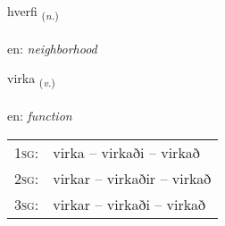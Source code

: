 \documentclass[frontgrid, backgrid]{flacards}\usepackage[]{graphicx}\usepackage[]{color}
\begin{document}
\renewcommand{\flhead}{\vskip5pt \fboxsep=0pt {\small\bfseries\footnotesize Nafnorð | Noun}}
\renewcommand{\fcfoot}{\vskip5pt \fboxsep=0pt \hspace{2pt}{\small\bfseries\footnotesize 2K}}

\renewcommand{\blhead}{\vskip5pt {\small\bfseries\footnotesize Nafnorð | Noun }}
\renewcommand{\bcfoot}{\vskip5pt \hspace{2pt}{\small\bfseries\footnotesize 2K}}


{hverfi \small{\textsubscript{(\textit{n.})}} \\[1ex] %
\textphonetic{[kʰvɛrvɪ]} \\
en: \emph{neighborhood} \\  [2ex]
\renewcommand*{\arraystretch}{0.8}
}

\renewcommand{\flhead}{\vskip5pt \fboxsep=0pt {\small\bfseries\footnotesize Sagnorð | Verb}}
\renewcommand{\fcfoot}{\vskip5pt \fboxsep=0pt \hspace{2pt}{\small\bfseries\footnotesize 2K}}

\renewcommand{\blhead}{\vskip5pt {\small\bfseries\footnotesize Sagnorð | Verb }}
\renewcommand{\bcfoot}{\vskip5pt \hspace{2pt}{\small\bfseries\footnotesize 2K}}


{virka \small{\textsubscript{(\textit{v.})}} \\[1ex] %
\textphonetic{[vɪr̥ka]} \\
en: \emph{function} \\  [2ex]
\renewcommand*{\arraystretch}{0.8}
\begin{tabular}{p{1cm}l}
\textsc{1sg}: & virka -- virkaði -- virkað \\ 
\textsc{2sg}: & virkar -- virkaðir -- virkað \\ 
\textsc{3sg}: & virkar -- virkaði -- virkað \\ 
\end{tabular}
}
\end{document}
